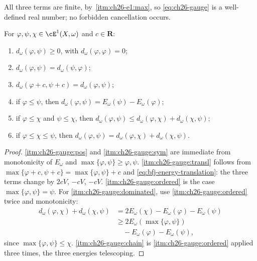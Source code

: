 All three terms are finite, by
\,\cref{itm:ch26-e1:max}, so
\eqref{eq:ch26-gauge} is a well-defined real number; no forbidden
cancellation occurs.

\begin{proposition}
\label{prop:ch26-gauge-elementary}
For $\varphi,\psi,\chi\in\cE^1(X,\omega)$ and $c\in\mathbf R$:
\begin{enumerate}
\item\label{itm:ch26-gauge:pos}
 $d_\omega(\varphi,\psi)\geq0$, with $d_\omega(\varphi,\varphi)=0$;
\item\label{itm:ch26-gauge:sym}
 $d_\omega(\varphi,\psi)=d_\omega(\psi,\varphi)$;
\item\label{itm:ch26-gauge:transl}
 $d_\omega(\varphi+c,\psi+c)=d_\omega(\varphi,\psi)$;
\item\label{itm:ch26-gauge:ordered}
 if $\varphi\leq\psi$, then
 $d_\omega(\varphi,\psi)=E_\omega(\psi)-E_\omega(\varphi)$;
\item\label{itm:ch26-gauge:dominated}
 if $\varphi\leq\chi$ and $\psi\leq\chi$, then
 $d_\omega(\varphi,\psi)\leq d_\omega(\varphi,\chi)+d_\omega(\chi,\psi)$;
\item\label{itm:ch26-gauge:chain}
 if $\varphi\leq\chi\leq\psi$, then
 $d_\omega(\varphi,\psi)=d_\omega(\varphi,\chi)+d_\omega(\chi,\psi)$.
\end{enumerate}
\end{proposition}

\begin{proof}
\cref{itm:ch26-gauge:pos} and \cref{itm:ch26-gauge:sym} are immediate from
monotonicity of $E_\omega$ and $\max\{\varphi,\psi\}\geq\varphi,\psi$.
\cref{itm:ch26-gauge:transl} follows from
$\max\{\varphi+c,\psi+c\}=\max\{\varphi,\psi\}+c$ and
\eqref{eq:bfj-energy-translation}: the three terms change by $2cV$,
$-cV$, $-cV$.  \cref{itm:ch26-gauge:ordered} is the case
$\max\{\varphi,\psi\}=\psi$.  For \cref{itm:ch26-gauge:dominated}, use
\cref{itm:ch26-gauge:ordered} twice and monotonicity:
\[
 \begin{aligned}
 d_\omega(\varphi,\chi)+d_\omega(\chi,\psi)
 &=2E_\omega(\chi)-E_\omega(\varphi)-E_\omega(\psi)\\
 &\geq 2E_\omega(\max\{\varphi,\psi\})\\
 &\quad-E_\omega(\varphi)-E_\omega(\psi),
 \end{aligned}
\]
since $\max\{\varphi,\psi\}\leq\chi$.  \cref{itm:ch26-gauge:chain} is
\cref{itm:ch26-gauge:ordered} applied three times, the three energies
telescoping.
\end{proof}

